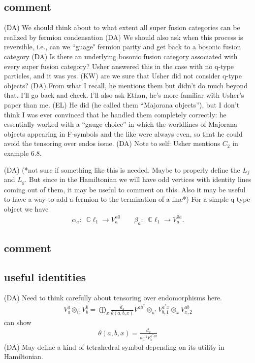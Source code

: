 \documentclass[12pt,a4paper]{article}
\newcounter{arrow}
\newcommand{\tp}{\otimes}
\newcommand{\kw}[1]{{\color{kwcolor}\footnotesize{(KW) #1}}}
\newcommand{\dave}[1]{{\color{ao(english)}\footnotesize{(DA) #1}}}
\newcommand{\ethan}[1]{{\color{amethyst}\footnotesize{(EL) #1}}}
\begin{document}
\subsection{comment}
\dave{We should think about to what extent all super fusion categories can be realized by fermion condensation}
\dave{We should also ask when this process is reversible, i.e., can we ``guage" fermion parity and get back to a bosonic fusion category}
\dave{Is there an underlying bosonic fusion category associated with every super fusion category? Usher answered this in the case with no q-type particles, and it was yes.} 
\kw{are we sure that Usher did not consider q-type objects?}
\dave{From what I recall, he mentions them but didn't do much beyond that. I'll go back and check. I'll also ask Ethan, he's more familiar with Usher's paper than me.} \ethan{He did (he called them ``Majorana objects''), but I don't think I was ever convinced that he handled them completely correctly: he essentially worked with a ``gauge choice'' in which the worldlines of Majorana objects appearing in F-symbols and the like were always even, so that he could avoid the tensoring over endos issue.} \dave{Note to self: Usher mentions $C_2$ in example 6.8.}

\dave{(*not sure if something like this is needed. Maybe to properly define the $L_f$ and $L_g$. But since in the Hamiltonian we will have odd vertices with identity lines coming out of them, it may be useful to comment on this. Also it may be useful to have a way to add a fermion to the termination of a line*)
For a simple q-type object we have
\begin{align}
\alpha_a: \; \; \mathbb{C} \ell_1 \rightarrow V^{a 0 }_a \quad \quad \beta_a: \; \; \mathbb{C} \ell_1 \rightarrow V^{0a }_a.
\end{align}
}
 
 

 
\subsection{comment}
\subsection{useful identities}
\dave{Need to think carefully about tensoring over endomorphisms here.}
\begin{align}
V^a_a \tp_{\mathbb{C}} V^b_b = \bigoplus_x \frac{d_x}{\theta(a,b,x)} V^{a a^*} \tp_{a^*}V^{a^*x}_{b,1} \tp_x V^{ab}_{x,2}
\end{align}
can show
\begin{align}
\theta(a,b,x) = \frac{d_x}{\kappa_a^{-1} F^{a^* a b}_b}
\end{align}
\dave{May define a kind of tetrahedral symbol depending on its utility in Hamiltonian.}
\end{document}
